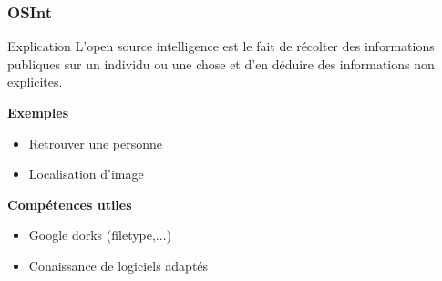 \documentclass{beamer}
\begin{document}

\begin{frame}
\frametitle{OSInt}

\begin{block}{Explication}
    L'open source intelligence est le fait de récolter des informations publiques sur un individu ou une chose et d'en déduire des informations non explicites.
\end{block}

\pause

\textbf{Exemples}
\begin{itemize}
    \item Retrouver une personne
    \item Localisation d'image
\end{itemize}

\pause

\textbf{Compétences utiles}
\begin{itemize}
    \item Google dorks (filetype,...)
    \item Conaissance de logiciels adaptés
\end{itemize}

\end{frame}

\end{document}
